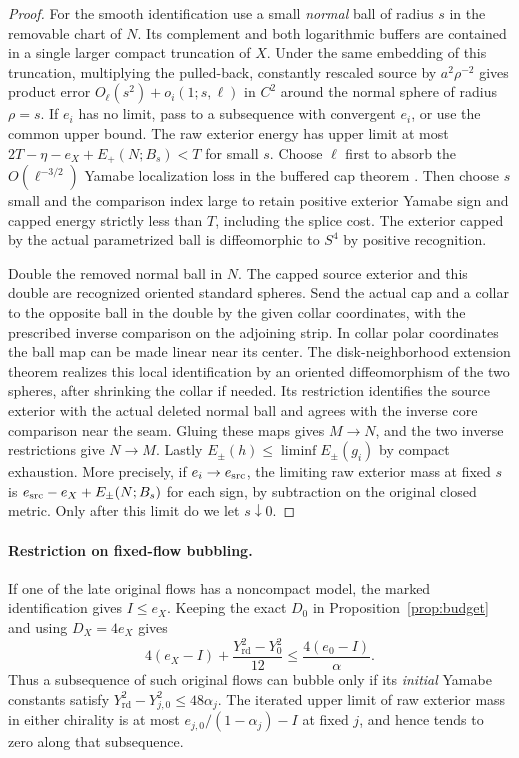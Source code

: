 \documentclass[11pt,letterpaper]{article}
\newcommand{\Yrd}{Y_{\mathrm{rd}}}
\begin{document}
\begin{proof}
For the smooth identification use a small \emph{normal} ball of radius
\(s\) in the removable chart of \(N\). Its complement and both
logarithmic buffers are contained in a single larger compact truncation
of \(X\). Under the same embedding of this truncation, multiplying the
pulled-back, constantly rescaled source by \(a^2\rho^{-2}\) gives
product error \(O_\ell(s^2)+o_i(1;s,\ell)\) in \(C^2\) around
the normal sphere of radius \(\rho=s\). If \(e_i\) has no limit,
pass to a subsequence with convergent \(e_i\), or use the common
upper bound. The raw exterior energy has upper limit at most
\(2T-\eta-e_X+E_+(N;B_s)<T\) for small \(s\).
Choose \(\ell\) first to absorb the \(O(\ell^{-3/2})\) Yamabe
localization loss in the buffered cap theorem
\cite[One buffered cut and finite ordinary punctures]{Baker2026MarkedNecks}.
Then choose \(s\) small and the comparison index large to retain
positive exterior Yamabe sign and capped energy strictly less than
\(T\), including the splice cost. The exterior capped by the actual
parametrized ball is diffeomorphic to \(S^4\) by positive recognition.

Double the removed normal ball in \(N\). The capped source exterior
and this double are recognized oriented standard spheres. Send the
actual cap and a collar to the opposite ball in the double by the
given collar coordinates, with the prescribed inverse comparison on
the adjoining strip. In collar polar coordinates the ball map can
be made linear near its center. The disk-neighborhood extension
theorem \cite[Theorem C]{Palais1960Extending} realizes this local
identification by an oriented diffeomorphism of the two spheres,
after shrinking the collar if needed. Its restriction identifies the
source exterior with the actual deleted normal ball and agrees with
the inverse core comparison near the seam. Gluing these maps gives
\(M\to N\), and the two inverse restrictions give \(N\to M\).
Lastly \(E_\pm(h)\le\liminf E_\pm(g_i)\) by compact exhaustion.
More precisely, if \(e_i\to e_{\rm src}\), the limiting raw exterior
mass at fixed \(s\) is \(e_{\rm src}-e_X+E_\pm(N;B_s)\) for each
sign, by subtraction on the original closed metric. Only after this
limit do we let \(s\downarrow0\).
\end{proof}

\paragraph{Restriction on fixed-flow bubbling.}
If one of the late original flows has a noncompact model, the marked
identification gives \(I\le e_X\). Keeping the exact \(D_0\) in
Proposition~\ref{prop:budget} and using \(D_X=4e_X\) gives
\[
  4(e_X-I)+\frac{\Yrd^2-Y_0^2}{12}
     \le\frac{4(e_0-I)}{\alpha}.
\]
Thus a subsequence of such original flows can bubble only if its
\emph{initial} Yamabe constants satisfy
\(\Yrd^2-Y_{j,0}^2\le48\alpha_j\). The iterated upper limit of raw exterior mass in
either chirality is at most \(e_{j,0}/(1-\alpha_j)-I\) at fixed \(j\),
and hence tends to zero along that subsequence.
\end{document}
